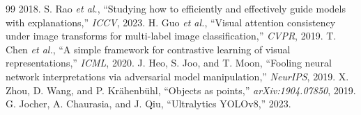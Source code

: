 \documentclass[conference]{IEEEtran}
\begin{document}
\begin{thebibliography}{99}
2018.
 S. Rao \emph{et al.}, ``Studying how to efficiently and effectively guide models with
explanations,'' \emph{ICCV}, 2023.
 H. Guo \emph{et al.}, ``Visual attention consistency under image transforms for multi-label
image classification,'' \emph{CVPR}, 2019.
 T. Chen \emph{et al.}, ``A simple framework for contrastive learning of visual
representations,'' \emph{ICML}, 2020.
 J. Heo, S. Joo, and T. Moon, ``Fooling neural network interpretations via adversarial model
manipulation,'' \emph{NeurIPS}, 2019.
 X. Zhou, D. Wang, and P. Kr\"ahenb\"uhl, ``Objects as points,'' \emph{arXiv:1904.07850},
2019.
 G. Jocher, A. Chaurasia, and J. Qiu, ``Ultralytics YOLOv8,'' 2023.
\end{thebibliography}
\end{document}
